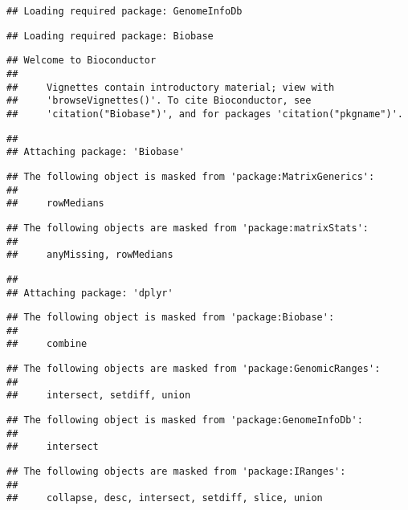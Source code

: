 \documentclass[
]{article}
\begin{document}
\begin{verbatim}
## Loading required package: GenomeInfoDb
\end{verbatim}

\begin{verbatim}
## Loading required package: Biobase
\end{verbatim}

\begin{verbatim}
## Welcome to Bioconductor
## 
##     Vignettes contain introductory material; view with
##     'browseVignettes()'. To cite Bioconductor, see
##     'citation("Biobase")', and for packages 'citation("pkgname")'.
\end{verbatim}

\begin{verbatim}
## 
## Attaching package: 'Biobase'
\end{verbatim}

\begin{verbatim}
## The following object is masked from 'package:MatrixGenerics':
## 
##     rowMedians
\end{verbatim}

\begin{verbatim}
## The following objects are masked from 'package:matrixStats':
## 
##     anyMissing, rowMedians
\end{verbatim}

\begin{verbatim}
## 
## Attaching package: 'dplyr'
\end{verbatim}

\begin{verbatim}
## The following object is masked from 'package:Biobase':
## 
##     combine
\end{verbatim}

\begin{verbatim}
## The following objects are masked from 'package:GenomicRanges':
## 
##     intersect, setdiff, union
\end{verbatim}

\begin{verbatim}
## The following object is masked from 'package:GenomeInfoDb':
## 
##     intersect
\end{verbatim}

\begin{verbatim}
## The following objects are masked from 'package:IRanges':
## 
##     collapse, desc, intersect, setdiff, slice, union
\end{verbatim}
\end{document}

